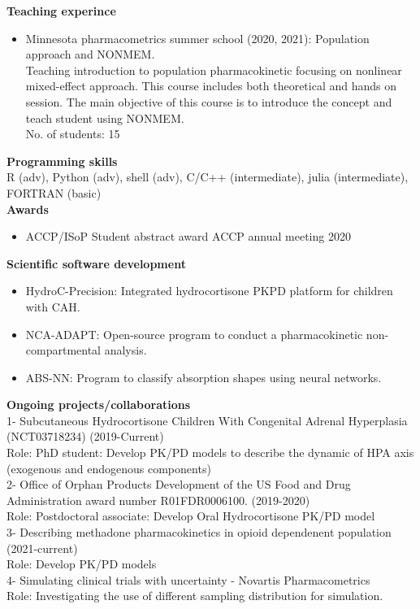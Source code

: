 \documentclass[a4paper,11pt]{article}
\begin{document}
\textbf{Teaching experince} \\
\begin{itemize}
\item Minnesota pharmacometrics summer school (2020, 2021): Population approach and NONMEM.
~\\
Teaching introduction to population pharmacokinetic focusing on nonlinear mixed-effect approach. This course includes both theoretical and hands on session. The main objective of this course is to introduce the concept and teach student using NONMEM. 
~\\ 
No. of students: 15    
\end{itemize}
\textbf{Programming skills}\\
R (adv), Python (adv), shell (adv), C/C++ (intermediate), julia (intermediate), FORTRAN (basic)\\
\textbf{Awards} \\

\begin{itemize}
\item ACCP/ISoP Student abstract award \hfill ACCP annual meeting 2020
\end{itemize}

\textbf{Scientific software development} \\
\begin{itemize}
\item HydroC-Precision: Integrated hydrocortisone PKPD platform for children with CAH.
\item NCA-ADAPT: Open-source program to conduct a pharmacokinetic non-compartmental analysis. 
\item ABS-NN: Program to classify absorption shapes using neural networks. 
\end{itemize}

\textbf{Ongoing projects/collaborations}\\
1- Subcutaneous Hydrocortisone Children With Congenital Adrenal Hyperplasia (NCT03718234) (2019-Current)
~\\
Role: PhD student: Develop PK/PD models to describe the dynamic of HPA axis (exogenous and endogenous components)
~\\
2- Office of Orphan Products Development of the US Food and Drug Administration award number R01FDR0006100. (2019-2020)
~\\
Role: Postdoctoral associate: Develop Oral Hydrocortisone PK/PD model
~\\
3- Describing methadone pharmacokinetics in opioid dependenent population (2021-current)
~\\
Role: Develop PK/PD models 
~\\
4- Simulating clinical trials with uncertainty - Novartis Pharmacometrics 
~\\
Role: Investigating the use of different sampling distribution for simulation. 
~\\
\nocite{*}
\printbibliography[title=Publications, keyword=papers]
\end{document}
